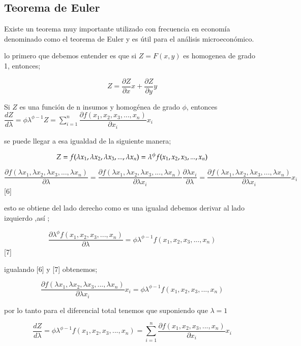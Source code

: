 \documentclass[12pt]{article}
\begin{document}
\subsection{Teorema de Euler}

Existe un teorema muy importante utilizado con frecuencia en economía denominado como el teorema de Euler y es útil para el análisis microeconómico.


lo primero que debemos entender es que si $Z=F(x,y)$ es homogenea de grado 1, entonces;


$$Z=\dfrac{\partial Z}{\partial x}x + \dfrac{\partial Z}{\partial y}y$$



\begin{theorem}

Si $Z$ es una función de n insumos y homogénea de grado $\phi$, entonces $\dfrac{dZ}{d \lambda}=\phi \lambda ^{\phi -1}Z = \sum_{i=1}^{n} \dfrac{\partial f(x_1,x_2,x_3,...,x_n)}{\partial x_{i}}x_{i}$


\end{theorem}

se puede llegar a esa igualdad de la siguiente manera;

$$Z=f(\lambda x_1,\lambda x_2,\lambda x_3,...,\lambda x_n)\\ =
\lambda^{\phi}f(x_1,x_2,x_3,...,x_n) $$


$$\dfrac{\partial f(\lambda x_1,\lambda x_2,\lambda x_3,...,\lambda x_n)}{\partial \lambda}=\dfrac{\partial f(\lambda x_1,\lambda x_2,\lambda x_3,...,\lambda x_n)}{\partial \lambda x_{i}} \dfrac{\partial \lambda x_{i}}{\partial \lambda}=\dfrac{\partial f(\lambda x_1,\lambda x_2,\lambda x_3,...,\lambda x_n)}{\partial \lambda x_{i}} x_{i} $$ [6]

esto se obtiene  del lado derecho como es una igualad debemos derivar al lado izquierdo ,así ;

$$ \dfrac{ \partial \lambda^{\phi}f(x_1,x_2,x_3,...,x_n)}{\partial \lambda} = \phi \lambda ^{\phi -1 }f(x_1,x_2,x_3,...,x_n)$$ [7]

igualando [6] y [7] obtenemos;


$$ \dfrac{\partial f(\lambda x_1,\lambda x_2,\lambda x_3,...,\lambda x_n)}{\partial \lambda x_{i}} x_{i} = \phi \lambda ^{\phi -1 }f(x_1,x_2,x_3,...,x_n)$$

por lo tanto para el diferencial total tenemos que suponiendo que $\lambda=1$

$$\dfrac{dZ}{d \lambda}= \phi \lambda ^{\phi -1 }f(x_1,x_2,x_3,...,x_n)= \sum_{i=1}^{n}  \dfrac{\partial f(x_1,x_2,x_3,...,x_n)}{\partial x_{i}}x_{i}   $$
\end{document}

